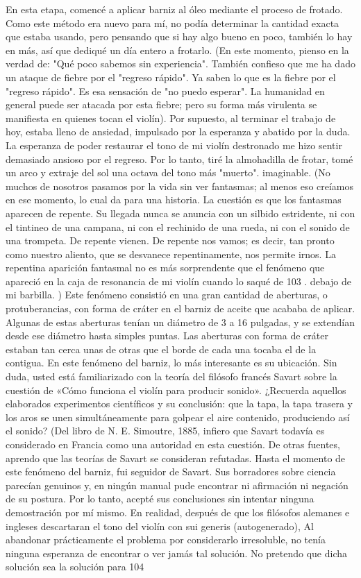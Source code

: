En esta etapa, comencé a aplicar barniz al óleo mediante el proceso de frotado. Como este método era nuevo para mí, no podía determinar la cantidad exacta que estaba usando, pero pensando que si hay algo bueno en poco, también lo hay en más, así que dediqué un día entero a frotarlo.
(En este momento, pienso en la verdad de: "Qué poco sabemos sin experiencia". También confieso que me ha dado un ataque de fiebre por el "regreso rápido". Ya saben lo que es la fiebre por el "regreso rápido". Es esa sensación de "no puedo esperar". La humanidad en general puede ser atacada por esta fiebre; pero su forma más virulenta se manifiesta en quienes tocan el violín). Por supuesto, al terminar el trabajo de hoy, estaba lleno de ansiedad, impulsado por la esperanza y abatido por la duda. La esperanza de poder restaurar el tono de mi violín destronado me hizo sentir demasiado ansioso por el regreso. Por lo tanto, tiré la almohadilla de frotar, tomé un arco y extraje del sol una octava del tono más "muerto".
imaginable.
(No muchos de nosotros pasamos por la vida sin ver fantasmas; al menos eso creíamos en ese momento, lo cual da para una historia. La cuestión es que los fantasmas aparecen de repente. Su llegada nunca se anuncia con un silbido estridente, ni con el tintineo de una campana, ni con el rechinido de una rueda, ni con el sonido de una trompeta. De repente vienen. De repente nos vamos; es decir, tan pronto como nuestro aliento, que se desvanece repentinamente, nos permite irnos. La repentina aparición fantasmal no es más sorprendente que el fenómeno que apareció en la caja de resonancia de mi violín cuando lo saqué de
103
.
debajo de mi barbilla. )
Este fenómeno consistió en una gran cantidad de aberturas, o protuberancias, con forma de cráter en el barniz de aceite que acababa de aplicar. Algunas de estas aberturas tenían un diámetro de 3 a 16 pulgadas, y se extendían desde ese diámetro hasta simples puntas. Las aberturas con forma de cráter estaban tan cerca unas de otras que el borde de cada una tocaba el de la contigua. En este fenómeno del barniz, lo más interesante es su ubicación. Sin duda, usted está familiarizado con la teoría del filósofo francés Savart sobre la cuestión de «Cómo funciona el violín para producir sonido». ¿Recuerda aquellos elaborados experimentos científicos y su conclusión: que la tapa, la tapa trasera y los aros se unen simultáneamente para golpear el aire contenido, produciendo así el sonido?
(Del libro de N. E. Simoutre, 1885, infiero que Savart todavía es considerado en Francia como una autoridad en esta cuestión. De otras fuentes, aprendo que las teorías de Savart se consideran refutadas. Hasta el momento de este fenómeno del barniz, fui seguidor de Savart. Sus borradores sobre ciencia parecían genuinos y, en ningún manual pude encontrar ni afirmación ni negación de su postura. Por lo tanto, acepté sus conclusiones sin intentar ninguna demostración por mí mismo. En realidad, después de que los filósofos alemanes e ingleses descartaran el tono del violín con sui generis (autogenerado),
Al abandonar prácticamente el problema por considerarlo irresoluble, no tenía ninguna esperanza de encontrar o ver jamás tal solución. No pretendo que dicha solución sea la solución para 104

